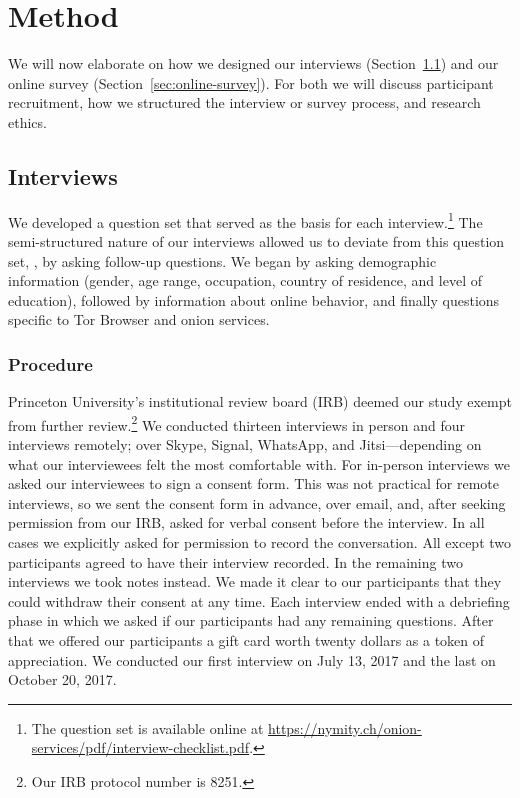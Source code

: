 \section{Method}
\label{sec:method}

We will now elaborate on how we designed our interviews
(Section~\ref{sec:interviews}) and our online survey
(Section~\ref{sec:online-survey}).  For both we will discuss participant
recruitment, how we structured the interview or survey process, and research
ethics.

\subsection{Interviews}
\label{sec:interviews}

We developed a question set that served as the basis for each
interview.\footnote{The question set is available online at
\url{https://nymity.ch/onion-services/pdf/interview-checklist.pdf}.}  The
semi-structured nature of our interviews allowed us to deviate from this
question set, \eg, by asking follow-up questions.  We began by asking
demographic information (gender, age range, occupation, country of residence,
and level of education), followed by information about online behavior, and
finally questions specific to Tor Browser and onion services.

\subsubsection{Procedure}

Princeton University's institutional review board (IRB) deemed our study exempt
from further review.\footnote{Our IRB protocol number is 8251.}  We conducted
thirteen interviews in person and four interviews remotely; over Skype, Signal,
WhatsApp, and Jitsi---depending on what our interviewees felt the most
comfortable with.  For in-person interviews we asked our interviewees to sign a
consent form.  This was not practical for remote interviews, so we sent the
consent form in advance, over email, and, after seeking permission from our IRB,
asked for verbal consent before the interview.  In all cases we explicitly asked
for permission to record the conversation.  All except two participants agreed
to have their interview recorded.  In the remaining two interviews we took notes
instead.  We made it clear to our participants that they could withdraw their
consent at any time.  Each interview ended with a debriefing phase in which we
asked if our participants had any remaining questions.  After that we offered
our participants a gift card worth twenty dollars as a token of appreciation.
We conducted our first interview on July 13, 2017 and the last on October 20,
2017.

